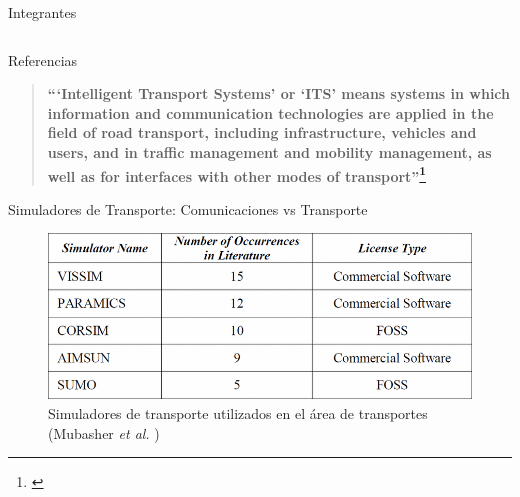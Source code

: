 \documentclass[aspectratio=169]{beamer}
\begin{document}
\begin{frame}{Integrantes}
\begin{columns}
\begin{column}{.5\textwidth}
    \end{column}
\end{columns}    
\end{frame}

\begin{frame}[c,allowframebreaks]{Referencias}
\printbibliography[heading=none]
\end{frame}

\begin{frame}%
\begin{quote}
    \centering
    \textbf{``‘Intelligent Transport Systems’ or ‘ITS’ means systems in which information and communication technologies are applied in the field of road transport, including infrastructure, vehicles and users, and in traffic management and mobility management, as well as for interfaces with other modes of transport''\footnote{\textcite{eudirective}}}
\end{quote}
\end{frame}

\begin{frame}{Simuladores de Transporte: Comunicaciones vs Transporte}
\begin{figure}[p]
    \centering
    \includegraphics[width=.8\linewidth]{figuras/popular_trafficsims.png}
    \caption{Simuladores de transporte utilizados en el área de transportes\\(Mubasher \emph{et al.} \autocite{traffic_sim_review})}
\end{figure}
\end{frame}
\end{document}
